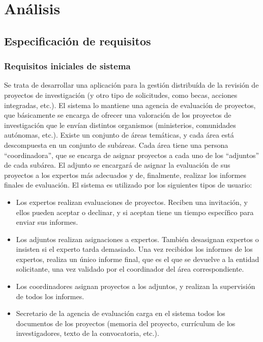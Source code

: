 \documentclass[12pt,a4paper,spanish,twoside]{book}
\begin{document}
\part{Análisis}
\chapter{Especificación de requisitos}
\section{Requisitos iniciales de sistema}
Se trata de desarrollar una aplicación para la gestión distribuída de la
revisión de proyectos de investigación (y otro tipo de solicitudes, como
becas, acciones integradas, etc.). El sistema lo mantiene una agencia de
evaluación de proyectos, que básicamente se encarga de ofrecer una valoración
de los proyectos de investigación que le envían distintos organismos
(ministerios, comunidades autónomas, etc.). Existe un conjunto de áreas
temáticas, y cada área está descompuesta en un conjunto de subáreas. Cada
área tiene una persona ``coordinadora'', que se encarga de asignar proyectos
a cada uno de los ``adjuntos'' de cada subárea. El adjunto se encargará de
asignar la evaluación de sus proyectos a los expertos más adecuados y de,
finalmente, realizar los informes finales de evaluación. El sistema es
utilizado por los siguientes tipos de usuario: 

\begin{itemize}
\item Los expertos realizan evaluaciones de proyectos. Reciben una 
  invitación, y ellos pueden aceptar o declinar, y si aceptan tiene un tiempo 
  específico para enviar sus informes. 
\item Los adjuntos realizan asignaciones a expertos. También desasignan
  expertos o insisten si el experto tarda demasiado. Una vez recibidos los 
  informes de los expertos, realiza un único informe final, que es el que se 
  devuelve a la entidad solicitante, una vez validado por el coordinador del 
  área correspondiente. 
\item Los coordinadores asignan proyectos a los adjuntos, y realizan la
  supervisión de todos los informes.
\item Secretario de la agencia de evaluación carga en el sistema todos
  los documentos de los proyectos (memoria del proyecto, currículum de los
  investigadores, texto de la convocatoria, etc.). 
\end{itemize}
\end{document}
